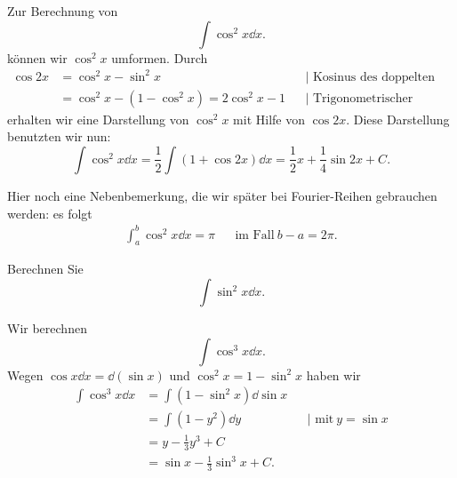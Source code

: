 \begin{bsp} 
	Zur Berechnung von 
	\[
		\int \cos^2 x \dd x .
	\]
	 können wir $\cos^2 x$ umformen. Durch 
	\begin{align*}
		\cos 2 x & = \cos^2 x - \sin^2 x  & &|\text{ Kosinus des doppelten Winkels} 
	\\	 & = \cos^2 x - (1- \cos^2 x) = 2 \cos^2 x -1 & &|\text{ Trigonometrischer Pythagoras} 
	\end{align*}
	erhalten wir eine Darstellung von $\cos^2 x$ mit Hilfe von $\cos 2 x$. Diese Darstellung benutzten wir nun: 
	\[
		\int \cos^2 x \dd x = \frac{1}{2} \int (1 + \cos 2 x) \dd x = \frac{1}{2} x + \frac{1}{4} \sin 2x + C.
	\]
	
	Hier noch eine Nebenbemerkung, die wir später bei Fourier-Reihen gebrauchen werden: es folgt 
	\begin{align*}
		\int_a^b \cos^2 x \dd x = \pi  & & \text{im Fall} \ b-a = 2 \pi. 
	\end{align*}
\end{bsp} 

\begin{aufg} 
	Berechnen Sie 
	\[
		\int \sin^2 x \dd x. 
	\]
\end{aufg} 

\begin{bsp}
	Wir berechnen 
	\[
		\int \cos^3 x \dd x.
	\]
	Wegen $\cos x \dd x = \dd (\sin x)$ und $\cos^2 x = 1 - \sin^2 x$ haben wir 
	\begin{align*}
			\int \cos^3 x \dd x & = \int (1- \sin^2 x) \dd \sin x 
			\\ & = \int (1 -y^2) \dd y & & |\text{ mit} \ y = \sin x
			\\ & = y - \frac{1}{3} y^3 + C
			\\ & = \sin x - \frac{1}{3} \sin^3 x + C.
	\end{align*}
\end{bsp} 

